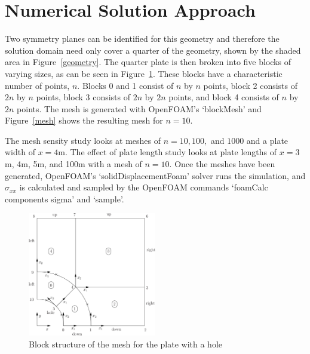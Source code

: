 \documentclass[twocolumn,10pt]{asme2ej}
\begin{document}
\section{Numerical Solution Approach}
 Two symmetry planes can be identified for this geometry and therefore the solution domain need only cover a quarter of the geometry, shown by the shaded area in Figure~\ref{geometry}. The quarter plate is then broken into five blocks of varying sizes, as can be seen in Figure~\ref{blocks}. These blocks have a characteristic number of points, $n$. Blocks 0 and 1 consist of $n$ by $n$ points, block 2 consists of $2n$ by $n$ points, block 3 consists of $2n$ by $2n$ points, and block 4 consists of $n$ by $2n$ points. The mesh is generated with OpenFOAM's `blockMesh' and Figure~\ref{mesh} shows the resulting mesh for $n = 10$.

 The mesh sensity study looks at meshes of $n = 10, 100, $ and $1000$ and a plate width of $x = 4$m. The effect of plate length study looks at plate lengths of $x = 3$m, 4m, 5m, and 100m with a mesh of $n = 10$. Once the meshes have been generated, OpenFOAM's `solidDisplacementFoam' solver runs the simulation, and $\sigma_{xx}$ is calculated and sampled by the OpenFOAM commands `foamCalc components sigma' and `sample'.

\begin{figure}[tb]
\begin{center}
\includegraphics[width=0.5\textwidth]{figure/user149x.png}
\caption{Block structure of the mesh for the plate with a hole}
\label{blocks}
\end{center}
\end{figure}
\end{document}
